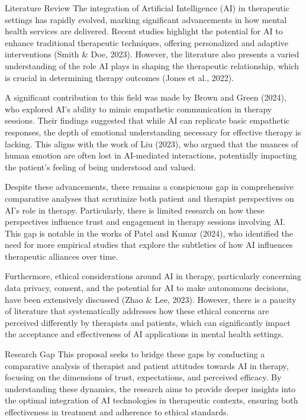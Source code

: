 \documentclass[12pt]{article}
\begin{document}
    Literature Review
    The integration of Artificial Intelligence (AI) in therapeutic settings has rapidly evolved, marking significant advancements in how mental health services are delivered. Recent studies highlight the potential for AI to enhance traditional therapeutic techniques, offering personalized and adaptive interventions (Smith & Doe, 2023). However, the literature also presents a varied understanding of the role AI plays in shaping the therapeutic relationship, which is crucial in determining therapy outcomes (Jones et al., 2022).

    A significant contribution to this field was made by Brown and Green (2024), who explored AI's ability to mimic empathetic communication in therapy sessions. Their findings suggested that while AI can replicate basic empathetic responses, the depth of emotional understanding necessary for effective therapy is lacking. This aligns with the work of Liu (2023), who argued that the nuances of human emotion are often lost in AI-mediated interactions, potentially impacting the patient's feeling of being understood and valued.

    Despite these advancements, there remains a conspicuous gap in comprehensive comparative analyses that scrutinize both patient and therapist perspectives on AI’s role in therapy. Particularly, there is limited research on how these perspectives influence trust and engagement in therapy sessions involving AI. This gap is notable in the works of Patel and Kumar (2024), who identified the need for more empirical studies that explore the subtleties of how AI influences therapeutic alliances over time.


    Furthermore, ethical considerations around AI in therapy, particularly concerning data privacy, consent, and the potential for AI to make autonomous decisions, have been extensively discussed (Zhao & Lee, 2023). However, there is a paucity of literature that systematically addresses how these ethical concerns are perceived differently by therapists and patients, which can significantly impact the acceptance and effectiveness of AI applications in mental health settings.

    Research Gap
    This proposal seeks to bridge these gaps by conducting a comparative analysis of therapist and patient attitudes towards AI in therapy, focusing on the dimensions of trust, expectations, and perceived efficacy. By understanding these dynamics, the research aims to provide deeper insights into the optimal integration of AI technologies in therapeutic contexts, ensuring both effectiveness in treatment and adherence to ethical standards.
\end{document}
